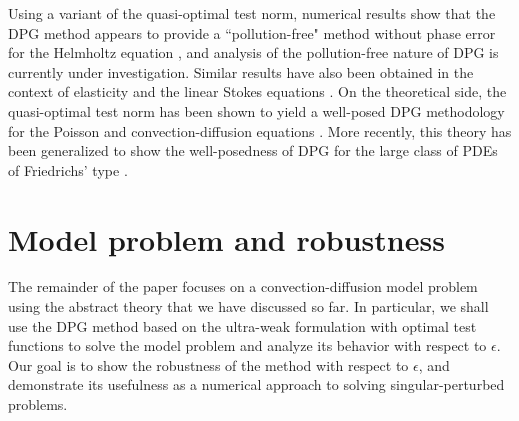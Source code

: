\documentclass[11pt,onecolumn]{scrartcl}
\newcommand{\seclab}[1]{\label{sec:#1}}
\begin{document}
Using a variant of the quasi-optimal test norm, numerical results show that the DPG method appears to provide a ``pollution-free" method without phase error for the Helmholtz equation \cite{DPG4}, and analysis of the pollution-free nature of DPG is currently under investigation. Similar results have also been obtained in the context of elasticity \cite{DPGElas} and the linear Stokes equations \cite{Camellia}. On the theoretical side, the quasi-optimal test norm has been shown to yield a well-posed DPG methodology for the Poisson and convection-diffusion equations \cite{analysisDPG}. More recently, this theory has been generalized to show the well-posedness of DPG for the large class of PDEs of Friedrichs' type \cite{Bui-ThanhDemkowiczGhattas11b}.  

\section{Model problem and robustness}
\seclab{sec:modelSec}
The remainder of the paper focuses on a convection-diffusion model problem using the abstract theory that we
have discussed so far. In particular, we shall use the DPG method based on the ultra-weak formulation with optimal test functions to solve the model problem and analyze its behavior with respect to $\epsilon$. 
Our goal is to show the robustness of the method with respect to $\epsilon$, and demonstrate its usefulness as  a numerical approach to solving singular-perturbed problems. 
\end{document}
